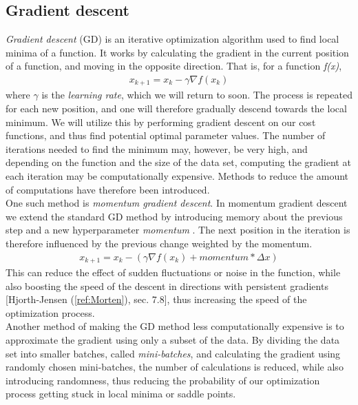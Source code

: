\documentclass[english,notitlepage,reprint,nofootinbib]{revtex4-1}  %
\begin{document}
\subsection{Gradient descent}
\textit{Gradient descent} (GD) is an iterative optimization algorithm used to find local minima of a function. It works by calculating the gradient in the current position of a function, and moving in the opposite direction. That is, for a function \textit{f(x)}, 
\begin{align}
    x_{k+1} = x_{k} - \gamma \nabla f(x_{k})
\end{align}
where $\gamma$ is the \textit{learning rate}, which we will return to soon. The process is repeated for each new position, and one will therefore gradually descend towards the local minimum. We will utilize this by performing gradient descent on our cost functions, and thus find potential optimal parameter values. The number of iterations needed to find the minimum may, however, be very high, and depending on the function and the size of the data set, computing the gradient at each iteration may be computationally expensive. Methods to reduce the amount of computations have therefore been introduced.\\
One such method is \textit{momentum gradient descent}. In momentum gradient descent we extend the standard GD method by introducing memory about the previous step and a new hyperparameter \textit{momentum} . The next position in the iteration is therefore influenced by the previous change weighted by the momentum.
\begin{align}
    x_{k+1} = x_{k} - (\gamma \nabla f(x_{k}) + momentum * \Delta x)
\end{align}
This can reduce the effect of sudden fluctuations or noise in the function, while also boosting the speed of the descent in directions with persistent gradients [Hjorth-Jensen (\ref{ref:Morten}), sec. 7.8], thus increasing the speed of the optimization process. %
\\
Another method of making the GD method less computationally expensive is to approximate the gradient using only a subset of the data. %
By dividing the data set into smaller batches, called \textit{mini-batches}, and calculating the gradient using randomly chosen mini-batches, the number of calculations is reduced, while also introducing randomness, thus reducing the probability of our optimization process getting stuck in local minima or saddle points. %
\end{document}
